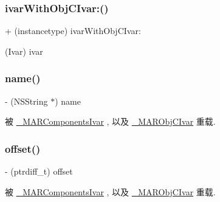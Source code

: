 \mbox{\label{interface_m_a_r_ivar_ad1184e972c18423d2ea2c6c700a402c2}} 
\subsubsection{\texorpdfstring{ivar\+With\+Obj\+C\+Ivar\+:()}{ivarWithObjCIvar:()}}
{\footnotesize\ttfamily + (instancetype) ivar\+With\+Obj\+C\+Ivar\+: \begin{DoxyParamCaption}\item[{(Ivar)}]{ivar }\end{DoxyParamCaption}}

\mbox{\label{interface_m_a_r_ivar_a9bb452e4b5f0d1517f4e6b2c9f328af7}} 
\subsubsection{\texorpdfstring{name()}{name()}}
{\footnotesize\ttfamily -\/ (N\+S\+String $\ast$) name \begin{DoxyParamCaption}{ }\end{DoxyParamCaption}}



被 \hyperlink{interface___m_a_r_components_ivar_ab0c07ae9b4db51465fa12aba2990698b}{\+\_\+\+M\+A\+R\+Components\+Ivar} , 以及 \hyperlink{interface___m_a_r_obj_c_ivar_a43dde43f4f9f5a541d420d49948e55c4}{\+\_\+\+M\+A\+R\+Obj\+C\+Ivar} 重载.

\mbox{\label{interface_m_a_r_ivar_a12af4637622b339aac3f19bc83c12c11}} 
\subsubsection{\texorpdfstring{offset()}{offset()}}
{\footnotesize\ttfamily -\/ (ptrdiff\+\_\+t) offset \begin{DoxyParamCaption}{ }\end{DoxyParamCaption}}



被 \hyperlink{interface___m_a_r_components_ivar_a116ec6be5840f75905da30dce18ac227}{\+\_\+\+M\+A\+R\+Components\+Ivar} , 以及 \hyperlink{interface___m_a_r_obj_c_ivar_a5dd2fd37ed0c072ef07b1d2a8edf37bb}{\+\_\+\+M\+A\+R\+Obj\+C\+Ivar} 重载.


